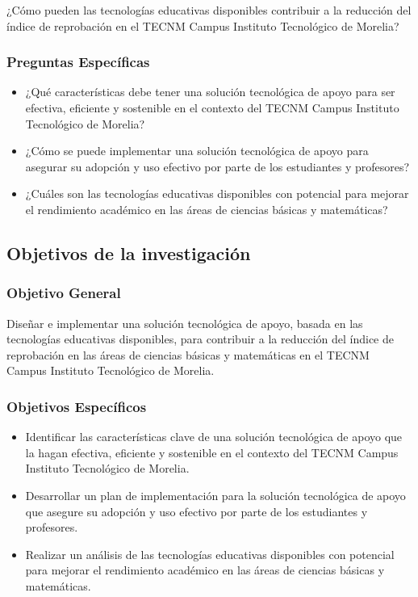 \documentclass{article}
\begin{document}
¿Cómo pueden las tecnologías educativas disponibles contribuir a la reducción del índice de reprobación en el TECNM Campus Instituto Tecnológico de Morelia? 

\subsubsection{Preguntas Específicas}

\begin{itemize}
  \item ¿Qué características debe tener una solución tecnológica de apoyo para ser efectiva, eficiente y sostenible en el contexto del TECNM Campus Instituto Tecnológico de Morelia? 
  \item ¿Cómo se puede implementar una solución tecnológica de apoyo para asegurar su adopción y uso efectivo por parte de los estudiantes y profesores? 
  \item ¿Cuáles son las tecnologías educativas disponibles con potencial para mejorar el rendimiento académico en las áreas de ciencias básicas y matemáticas?
\end{itemize}

\subsection{Objetivos de la investigación}
\subsubsection{Objetivo General}
Diseñar e implementar una solución tecnológica de apoyo, basada en las tecnologías educativas disponibles, para contribuir a la reducción del índice de reprobación en las áreas de ciencias básicas y matemáticas en el TECNM Campus Instituto Tecnológico de Morelia.
\subsubsection{Objetivos Específicos}
\begin{itemize}
  \item Identificar las características clave de una solución tecnológica de apoyo que la hagan efectiva, eficiente y sostenible en el contexto del TECNM Campus Instituto Tecnológico de Morelia.
  \item Desarrollar un plan de implementación para la solución tecnológica de apoyo que asegure su adopción y uso efectivo por parte de los estudiantes y profesores. 
  \item Realizar un análisis de las tecnologías educativas disponibles con potencial para mejorar el rendimiento académico en las áreas de ciencias básicas y matemáticas.
\end{itemize}
\end{document}
